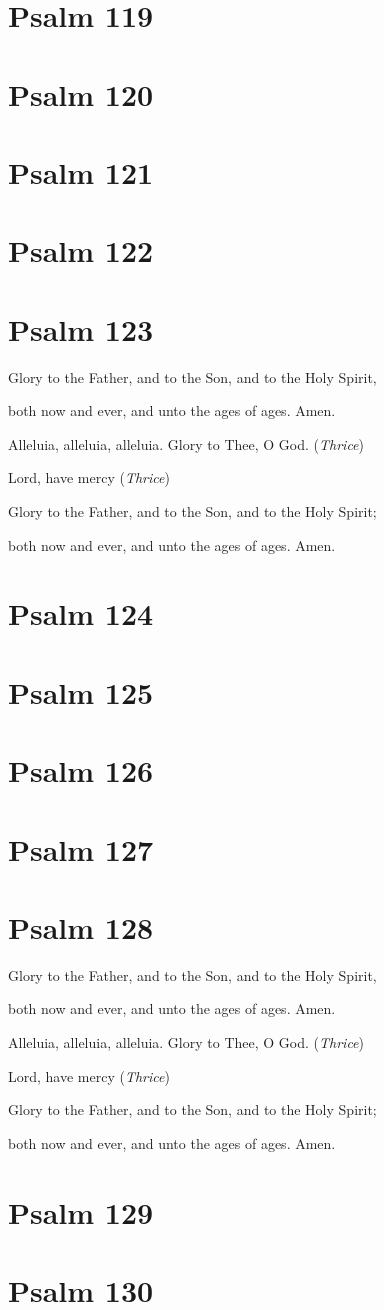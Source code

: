 \documentclass[12pt,openany]{book}
\newcommand{\kathismabreak}{
  \medskip
  \begin{center}
  \begin{footnotesize}
  Glory to the Father, and to the Son, and to the Holy Spirit,
  
  both now and ever, and unto the ages of ages. Amen.

  Alleluia, alleluia, alleluia. Glory to Thee, O God. (\textit{Thrice})

  Lord, have mercy (\textit{Thrice})

  Glory to the Father, and to the Son, and to the Holy Spirit;
  
  both now and ever, and unto the ages of ages. Amen.
  \end{footnotesize}
  \end{center}
  \smallbreak
}
\begin{document}
\section{Psalm 119}

\smallskip
\section{Psalm 120}

\smallskip
\section{Psalm 121}

\smallskip
\section{Psalm 122}

\smallskip
\section{Psalm 123}


\pagebreak %
\kathismabreak
\smallskip

\section{Psalm 124}

\smallskip
\section{Psalm 125}

\smallskip
\section{Psalm 126}

\smallskip
\section{Psalm 127}

\smallskip
\section{Psalm 128}


\kathismabreak
\smallskip
\section{Psalm 129}

\smallskip
\section{Psalm 130}

\smallskip
\end{document}
